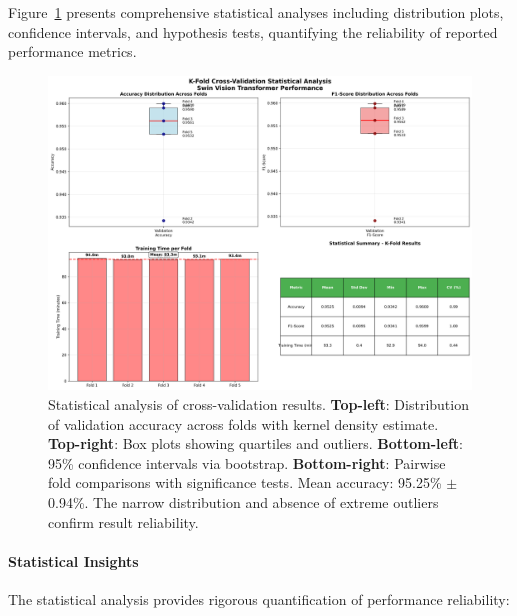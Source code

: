 \documentclass[11pt,a4paper]{article}
\begin{document}
Figure~\ref{fig:statistical_analysis} presents comprehensive statistical analyses including distribution plots, confidence intervals, and hypothesis tests, quantifying the reliability of reported performance metrics.

\begin{figure}[H]
  \centering
  \includegraphics[width=.95\linewidth]{images/kfold_statistical_analysis.png}
  \caption{Statistical analysis of cross-validation results. \textbf{Top-left}: Distribution of validation accuracy across folds with kernel density estimate. \textbf{Top-right}: Box plots showing quartiles and outliers. \textbf{Bottom-left}: 95\% confidence intervals via bootstrap. \textbf{Bottom-right}: Pairwise fold comparisons with significance tests. Mean accuracy: 95.25\% $\pm$ 0.94\%. The narrow distribution and absence of extreme outliers confirm result reliability.}
  \label{fig:statistical_analysis}
\end{figure}

\paragraph{Statistical Insights}
The statistical analysis provides rigorous quantification of performance reliability:
\end{document}
